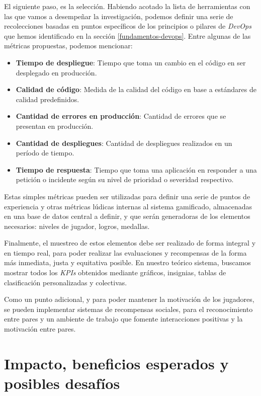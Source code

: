 \documentclass[journal]{IEEEtran}
\begin{document}
El siguiente paso, es la selección. Habiendo acotado la lista de herramientas con las que vamos a desempeñar la investigación, podemos definir una serie de recolecciones basadas en puntos específicos de los principios o pilares de \textit{DevOps} que hemos identificado en la sección \ref{fundamentos-devops}. Entre algunas de las métricas propuestas, podemos mencionar:
\begin{itemize}
    \item \textbf{Tiempo de despliegue}: Tiempo que toma un cambio en el código en ser desplegado en producción.
    \item \textbf{Calidad de código}: Medida de la calidad del código en base a estándares de calidad predefinidos.
    \item \textbf{Cantidad de errores en producción}: Cantidad de errores que se presentan en producción.
    \item \textbf{Cantidad de despliegues}: Cantidad de despliegues realizados en un período de tiempo.
    \item \textbf{Tiempo de respuesta}: Tiempo que toma una aplicación en responder a una petición o incidente según su nivel de prioridad o severidad respectivo.
\end{itemize}

Estas simples métricas pueden ser utilizadas para definir una serie de puntos de experiencia y otras métricas lúdicas internas al sistema gamificado, almacenadas en una base de datos central a definir, y que serán generadoras de los elementos necesarios: niveles de jugador, logros, medallas.

Finalmente, el muestreo de estos elementos debe ser realizado de forma integral y en tiempo real, para poder realizar las evaluaciones y recompensas de la forma más inmediata, justa y equitativa posible. En nuestro teórico sistema, buscamos mostrar todos los \textit{KPIs} obtenidos mediante gráficos, insignias, tablas de clasificación personalizadas y colectivas.

Como un punto adicional, y para poder mantener la motivación de los jugadores, se pueden implementar sistemas de recompensas sociales, para el reconocimiento entre pares y un ambiente de trabajo que fomente interacciones positivas y la motivación entre pares.

\section{\textbf{\Large Impacto, beneficios esperados y posibles desafíos}}
\end{document}
